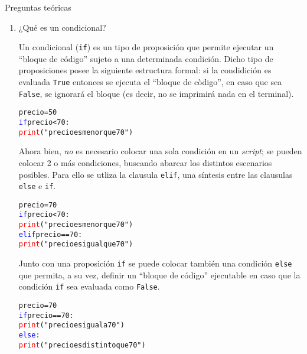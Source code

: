 \documentclass{article}
\begin{document}
\begin{center}
  \LARGE{Preguntas teóricas}    \\
\end{center}

\vspace{0.5cm}

\begin{enumerate}
\item ¿Qué es un condicional?
\par\hspace{5pt} Un condicional (\verb|if|) es un tipo de proposición que permite ejecutar un ``bloque de código'' sujeto a una determinada condición. Dicho tipo de proposiciones posee la siguiente estructura formal: si la condidición es evaluada \verb|True| entonces se ejecuta el ``bloque de còdigo'', en caso que sea \verb|False|, se ignorará el bloque (es decir, no se imprimirá nada en el terminal).  
\begin{tcolorbox}
\begin{alltt}
precio = 50
\textcolor{blue}{if} precio < 70:
    \textcolor{red}{print}("precio es menor que 70")
\end{alltt}        
\end{tcolorbox}
\par\hspace{5pt} Ahora bien, \emph{no} es necesario colocar una sola condición en un \emph{script}; se pueden colocar 2 o más condiciones, buscando abarcar los distintos escenarios posibles. Para ello se utliza la clausula \verb|elif|, una síntesis entre las clausulas \verb|else| e \verb|if|.
\begin{tcolorbox}
\begin{alltt}
precio = 70
\textcolor{blue}{if} precio < 70:
    \textcolor{red}{print}("precio es menor que 70")
\textcolor{blue}{elif} precio == 70:
    \textcolor{red}{print}("precio es igual que 70")
\end{alltt}        
\end{tcolorbox}
\par\hspace{5pt} Junto con una proposición \verb|if| se puede colocar también una condición \verb|else| que permita, a su vez, definir un ``bloque de código'' ejecutable en caso que la condición \verb|if| sea evaluada como \verb|False|.
\begin{tcolorbox}
  \begin{alltt}
  precio = 70
  \textcolor{blue}{if} precio == 70:
    \textcolor{red}{print}("precio es igual a  70")
  \textcolor{blue}{else}:
    \textcolor{red}{print}("precio es distinto que 70")
  \end{alltt}        
  \end{tcolorbox}
\vspace{0.5cm}


\end{enumerate}
\end{document}
